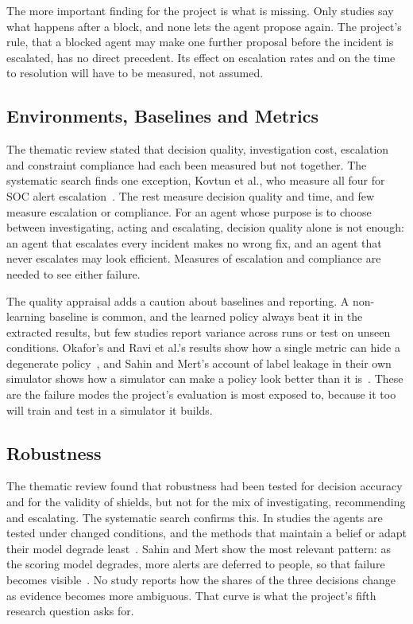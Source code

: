 The more important finding for the project is what is missing. Only \NBlocked{} studies say what happens after a block, and none lets the agent propose again. The project's rule, that a blocked agent may make one further proposal before the incident is escalated, has no direct precedent. Its effect on escalation rates and on the time to resolution will have to be measured, not assumed.

\subsection{Environments, Baselines and Metrics}

The thematic review stated that decision quality, investigation cost, escalation and constraint compliance had each been measured but not together. The systematic search finds one exception, Kovtun et al., who measure all four for SOC alert escalation~\cite{kovtun2026}. The rest measure decision quality and time, and few measure escalation or compliance. For an agent whose purpose is to choose between investigating, acting and escalating, decision quality alone is not enough: an agent that escalates every incident makes no wrong fix, and an agent that never escalates may look efficient. Measures of escalation and compliance are needed to see either failure.

The quality appraisal adds a caution about baselines and reporting. A non-learning baseline is common, and the learned policy always beat it in the extracted results, but few studies report variance across runs or test on unseen conditions. Okafor's and Ravi et al.'s results show how a single metric can hide a degenerate policy~\cite{okafor2026,ravi2025}, and Sahin and Mert's account of label leakage in their own simulator shows how a simulator can make a policy look better than it is~\cite{sahin2026}. These are the failure modes the project's evaluation is most exposed to, because it too will train and test in a simulator it builds.

\subsection{Robustness}

The thematic review found that robustness had been tested for decision accuracy and for the validity of shields, but not for the mix of investigating, recommending and escalating. The systematic search confirms this. In \NRobust{} studies the agents are tested under changed conditions, and the methods that maintain a belief or adapt their model degrade least~\cite{hammar2025,hammar2026belief}. Sahin and Mert show the most relevant pattern: as the scoring model degrades, more alerts are deferred to people, so that failure becomes visible~\cite{sahin2026}. No study reports how the shares of the three decisions change as evidence becomes more ambiguous. That curve is what the project's fifth research question asks for.

